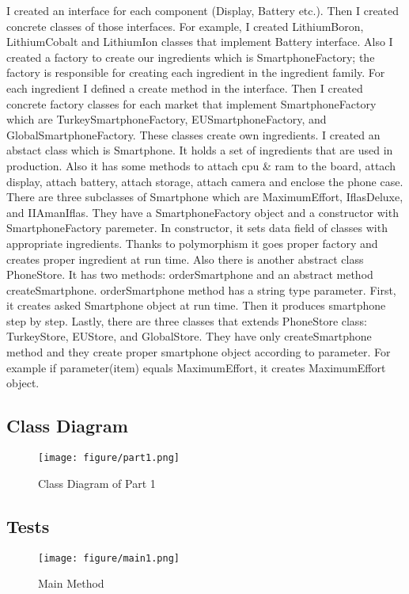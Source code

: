 \documentclass[twoside,11pt]{article}
\begin{document}
I created an interface for each component (Display, Battery etc.). Then I created concrete classes of those interfaces. For example, I created LithiumBoron, LithiumCobalt and LithiumIon classes that implement Battery interface. Also I created a factory to create our ingredients which is SmartphoneFactory; the factory is responsible for creating each ingredient in the ingredient family. For each ingredient I defined a create method in the interface. Then I created concrete factory classes for each market that implement SmartphoneFactory which are TurkeySmartphoneFactory, EUSmartphoneFactory, and GlobalSmartphoneFactory. These classes create own ingredients. I created an abstact class which is Smartphone. It holds a set of ingredients that are used in production. Also it has some methods to attach cpu & ram to the board, attach display, attach battery, attach storage, attach camera and enclose the phone case. There are three subclasses of Smartphone which are MaximumEffort, IflasDeluxe, and IIAmanIflas. They have a SmartphoneFactory object and a constructor with SmartphoneFactory paremeter. In constructor, it sets data field of classes with appropriate ingredients. Thanks to polymorphism it goes proper factory and creates proper ingredient at run time. Also there is another abstract class PhoneStore. It has two methods: orderSmartphone and an abstract method createSmartphone. orderSmartphone method has a string type parameter. First, it creates asked Smartphone object at run time. Then it produces smartphone step by step. Lastly, there are three classes that extends PhoneStore class: TurkeyStore, EUStore, and GlobalStore. They have only createSmartphone method and they create proper smartphone object according to parameter. For example if parameter(item) equals MaximumEffort, it creates MaximumEffort object. \newpage

\subsection{Class Diagram}

\begin{figure}[h]
\caption{Class Diagram of Part 1}
\centering
\texttt{[image: figure/part1.png]}
\end{figure}

\subsection{Tests}

\begin{figure}[h]
\caption{Main Method}
\centering
\texttt{[image: figure/main1.png]}
\end{figure}
\end{document}
